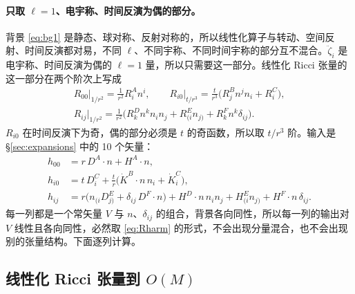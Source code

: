 \documentclass[11pt,a4paper]{ctexart}
\numberwithin{equation}{section}
\begin{document}
\paragraph{只取 $\ell=1$、电宇称、时间反演为偶的部分。}背景 \eqref{eq:bg1} 是静态、球对称、反射对称的，所以线性化算子与转动、空间反射、时间反演都对易，不同 $\ell$、不同宇称、不同时间宇称的部分互不混合。$\ddot\zeta_i$ 是电宇称、时间反演为偶的 $\ell=1$ 量，所以只需要这一部分。线性化 Ricci 张量的这一部分在两个阶次上写成
\begin{gather}
R_{00}\big|_{1/r^2}=\frac{1}{r^2}R^A_in^i,\qquad
R_{i0}\big|_{t/r^3}=\frac{t}{r^3}\big(R^B_jn^jn_i+R^C_i\big),\nonumber\\
R_{ij}\big|_{1/r^2}=\frac1{r^2}\big(R^D_kn^kn_in_j+R^E_{(i}n_{j)}+R^F_kn^k\delta_{ij}\big).
\label{eq:Rharm}
\end{gather}
$R_{i0}$ 在时间反演下为奇，偶的部分必须是 $t$ 的奇函数，所以取 $t/r^3$ 阶。输入是 \S\ref{sec:expansions} 中的 10 个矢量：
\begin{align}
h_{00}&=r\,D^A\!\cdot n+H^A\!\cdot n,\nonumber\\
h_{i0}&=t\,D^C_i+\frac tr\big(\dot K^B\!\cdot n\,n_i+\dot K^C_i\big),\label{eq:L1input}\\
h_{ij}&=r\big(n_{(i}D^E_{j)}+\delta_{ij}\,D^F\!\cdot n\big)+H^D\!\cdot n\,n_in_j+H^E_{(i}n_{j)}+H^F\!\cdot n\,\delta_{ij}.\nonumber
\end{align}
每一列都是一个常矢量 $V$ 与 $n$、$\delta_{ij}$ 的组合，背景各向同性，所以每一列的输出对 $V$ 线性且各向同性，必然取 \eqref{eq:Rharm} 的形式，不会出现分量混合，也不会出现别的张量结构。下面逐列计算。

\subsection{线性化 Ricci 张量到 $O(M)$}
\label{sec:Ricci}
\end{document}
